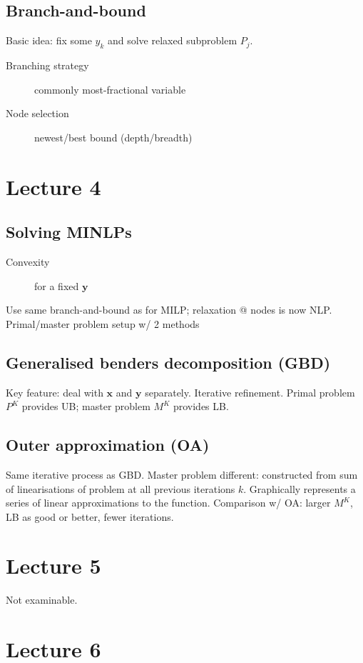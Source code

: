 \documentclass[a4paper,twocolumn,10pt]{article}
\begin{document}
\subsection{Branch-and-bound}
Basic idea: fix some $y_k$ and solve relaxed subproblem $P_j$.
\begin{description}
    \item[Branching strategy] commonly most-fractional variable
    \item[Node selection] newest/best bound (depth/breadth)
\end{description}

\section{Lecture 4}
\subsection{Solving MINLPs}
\begin{description}
    \item[Convexity] for a fixed $\boldsymbol{y}$
\end{description}
Use same branch-and-bound as for MILP; relaxation @ nodes is now NLP. Primal/master problem setup w/ 2 methods
\subsection{Generalised benders decomposition (GBD)}
Key feature: deal with $\boldsymbol{x}$ and $\boldsymbol{y}$ separately. Iterative refinement. Primal problem $P^K$ provides UB; master problem $M^K$ provides LB.
\subsection{Outer approximation (OA)}
Same iterative process as GBD. Master problem different: constructed from sum of linearisations of problem at all previous iterations $k$. Graphically represents a series of linear approximations to the function.
Comparison w/ OA: larger $M^K$, LB as good or better, fewer iterations.

\section{Lecture 5}

Not examinable.

\section{Lecture 6}
\end{document}
